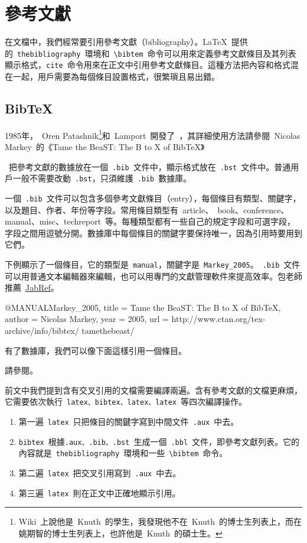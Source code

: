 \section{參考文獻}
在文檔中，我們經常要引用參考文獻（bibliography）。\LaTeX~提供的~\verb|thebibliography|~環境和~\verb|\bibtem|~命令可以用來定義參考文獻條目及其列表顯示格式，\verb|cite|~命令用來在正文中引用參考文獻條目。這種方法把內容和格式混在一起，用戶需要為每個條目設置格式，很繁瑣且易出錯。

\subsection{BibTeX}
1985年，~Oren Patashnik\footnote{Wiki~上說他是~Knuth~的學生，我發現他不在~Knuth~的博士生列表上，而在姚期智的博士生列表上，也許他是~Knuth~的碩士生。}和~Lamport~開發了~\BibTeX\citep{Patashnik_1988}，其詳細使用方法請參閱~Nicolas Markey~的《Tame the BeaST: The B to X of BibTeX》\citep{Markey_2005}

\BibTeX~把參考文獻的數據放在一個~\verb|.bib|~文件中，顯示格式放在~\verb|.bst|~文件中。普通用戶一般不需要改動~\verb|.bst|，只須維護~\verb|.bib|~數據庫。

一個~\verb|.bib|~文件可以包含多個參考文獻條目（entry），每個條目有類型、關鍵字，以及題目、作者、年份等字段。常用條目類型有~article、~book、conference、manual、misc、techreport~等。每種類型都有一些自己的規定字段和可選字段，字段之間用逗號分開。數據庫中每個條目的關鍵字要保持唯一，因為引用時要用到它們。

下例顯示了一個條目，它的類型是~\verb|manual|，關鍵字是~\verb|Markey_2005|。~\verb|.bib|~文件可以用普通文本編輯器來編輯，也可以用專門的文獻管理軟件來提高效率。包老師推薦~\href{http://jabref.sourceforge.net/}{JabRef}。

\begin{code}
@MANUAL{Markey_2005,
  title = {Tame the BeaST: The B to X of BibTeX},
  author = {Nicolas Markey},
  year = {2005},
  url = {http://www.ctan.org/tex-archive/info/bibtex/
    tamethebeast/}
}
\end{code}

有了數據庫，我們可以像下面這樣引用一個條目。
\begin{demo}
請參閱\cite{Markey_2005}。
\end{demo}

前文中我們提到含有交叉引用的文檔需要編譯兩遍。含有參考文獻的文檔更麻煩，它需要依次執行~\verb|latex、bibtex、latex、latex|~等四次編譯操作。

\begin{enumerate}
    \item 第一遍~\verb|latex|~只把條目的關鍵字寫到中間文件~\verb|.aux|~中去。
    \item \verb|bibtex|~根據\verb|.aux、.bib、.bst|~生成一個~\verb|.bbl|~文件，即參考文獻列表。它的內容就是~\verb|thebibliography|~環境和一些~\verb|\bibtem|~命令。
    \item 第二遍~\verb|latex|~把交叉引用寫到~\verb|.aux|~中去。
    \item 第三遍~\verb|latex|~則在正文中正確地顯示引用。
\end{enumerate}

